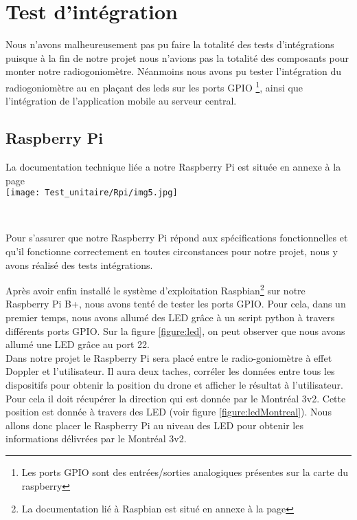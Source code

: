 
\chapter{Test d'intégration}

Nous n'avons malheureusement pas pu faire la totalité des tests d'intégrations puisque à la fin de notre projet nous n'avions pas la totalité des composants pour monter notre radiogoniomètre. Néanmoins nous avons pu tester l'intégration du radiogoniomètre au \rpi en plaçant des leds sur les ports GPIO \footnote{Les ports GPIO sont des entrées/sorties analogiques présentes sur la carte du raspberry}, ainsi que l'intégration de l'application mobile au serveur central.


\section{Raspberry Pi}
La documentation technique liée a notre Raspberry Pi est située en annexe à la page \pageref{annexe:rpi}
~\\

\texttt{[image: Test\_unitaire/Rpi/img5.jpg]}

~\\
\parindent=15pt

Pour s'assurer que notre Raspberry Pi répond aux spécifications fonctionnelles et qu'il fonctionne correctement en toutes circonstances pour notre projet, nous y avons réalisé des tests intégrations.

Après avoir enfin installé le système d'exploitation Raspbian\footnote{La documentation lié à Raspbian est situé en annexe à la page \pageref{annexe:raspbian}} sur notre Raspberry Pi B+, nous avons tenté de tester les ports GPIO. Pour cela, dans un premier temps, nous avons allumé des LED grâce à un script python à travers différents ports GPIO. Sur la figure \ref{figure:led}, on peut observer que nous avons allumé une LED grâce au port 22.
~\\

Dans notre projet le Raspberry Pi sera placé entre le radio-goniomètre à effet Doppler et l'utilisateur. Il aura deux taches, corréler les données entre tous les dispositifs pour obtenir la position du drone et afficher le résultat à l'utilisateur. Pour cela il doit récupérer la direction qui est donnée par le Montréal 3v2. Cette position est donnée à travers des LED (voir figure \ref{figure:ledMontreal}). Nous allons donc placer le Raspberry Pi au niveau des LED pour obtenir les informations délivrées par le Montréal 3v2. %

